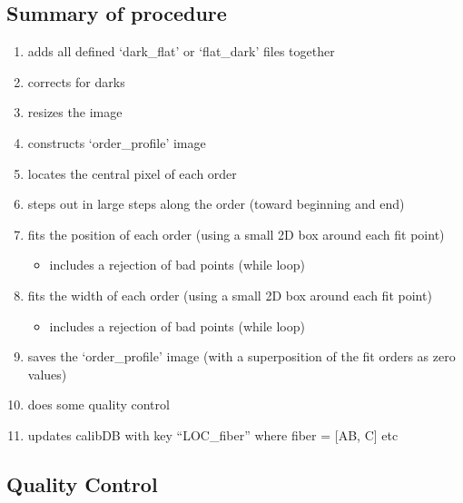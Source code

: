 \subsection{Summary of procedure}
\begin{enumerate}
\item adds all defined `dark\_flat' or `flat\_dark' files together
\item corrects for darks
\item resizes the image
\item constructs `order\_profile' image
\item locates the central pixel of each order
\item steps out in large steps along the order (toward beginning and end)
\item fits the position of each order (using a small 2D box around each fit point)
	\begin{itemize}
	\item includes a rejection of bad points (while loop)
	\end{itemize}
\item fits the width of each order (using a small 2D box around each fit point)
	\begin{itemize}
	\item includes a rejection of bad points (while loop)
	\end{itemize}
\item saves the `order\_profile' image (with a superposition of the fit orders as zero values)
\item does some quality control
\item updates calibDB with key ``LOC\_{fiber}'' where {fiber} = [AB, C] etc
\end{enumerate}



\subsection{Quality Control}

